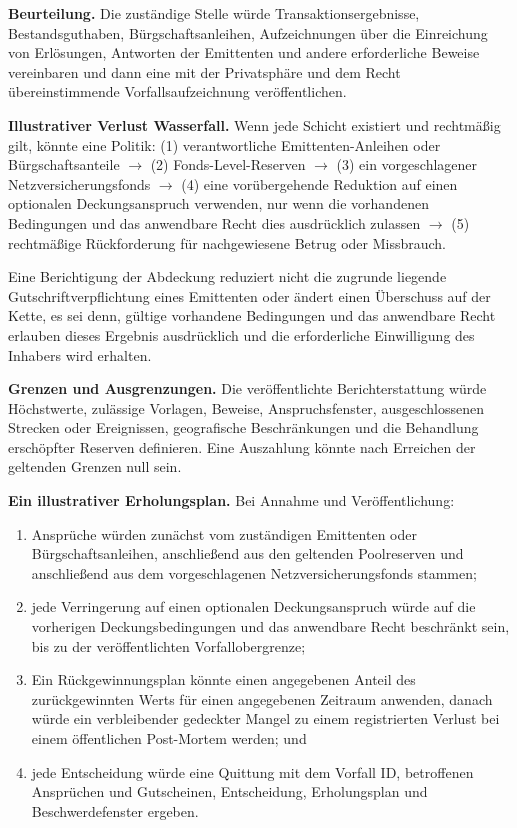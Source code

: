 \documentclass[11pt]{article}
\begin{document}
\textbf{Beurteilung.} Die zuständige Stelle würde Transaktionsergebnisse, Bestandsguthaben, Bürgschaftsanleihen, Aufzeichnungen über die Einreichung von Erlösungen, Antworten der Emittenten und andere erforderliche Beweise vereinbaren und dann eine mit der Privatsphäre und dem Recht übereinstimmende Vorfallsaufzeichnung veröffentlichen.

\textbf{Illustrativer Verlust Wasserfall.} Wenn jede Schicht existiert und rechtmäßig gilt, könnte eine Politik: (1) verantwortliche Emittenten-Anleihen oder Bürgschaftsanteile $\to$ (2) Fonds-Level-Reserven $\to$ (3) ein vorgeschlagener Netzversicherungsfonds $\to$ (4) eine vorübergehende Reduktion auf einen optionalen Deckungsanspruch verwenden, nur wenn die vorhandenen Bedingungen und das anwendbare Recht dies ausdrücklich zulassen $\to$ (5) rechtmäßige Rückforderung für nachgewiesene Betrug oder Missbrauch.

Eine Berichtigung der Abdeckung reduziert nicht die zugrunde liegende Gutschriftverpflichtung eines Emittenten oder ändert einen Überschuss auf der Kette, es sei denn, gültige vorhandene Bedingungen und das anwendbare Recht erlauben dieses Ergebnis ausdrücklich und die erforderliche Einwilligung des Inhabers wird erhalten.

\textbf{Grenzen und Ausgrenzungen.} Die veröffentlichte Berichterstattung würde Höchstwerte, zulässige Vorlagen, Beweise, Anspruchsfenster, ausgeschlossenen Strecken oder Ereignissen, geografische Beschränkungen und die Behandlung erschöpfter Reserven definieren. Eine Auszahlung könnte nach Erreichen der geltenden Grenzen null sein.

\textbf{Ein illustrativer Erholungsplan.} Bei Annahme und Veröffentlichung:

\begin{enumerate}[leftmargin=*]
\item Ansprüche würden zunächst vom zuständigen Emittenten oder Bürgschaftsanleihen, anschließend aus den geltenden Poolreserven und anschließend aus dem vorgeschlagenen Netzversicherungsfonds stammen;
\item jede Verringerung auf einen optionalen Deckungsanspruch würde auf die vorherigen Deckungsbedingungen und das anwendbare Recht beschränkt sein, bis zu der veröffentlichten Vorfallobergrenze;
\item Ein Rückgewinnungsplan könnte einen angegebenen Anteil des zurückgewinnten Werts für einen angegebenen Zeitraum anwenden, danach würde ein verbleibender gedeckter Mangel zu einem registrierten Verlust bei einem öffentlichen Post-Mortem werden; und
\item jede Entscheidung würde eine Quittung mit dem Vorfall ID, betroffenen Ansprüchen und Gutscheinen, Entscheidung, Erholungsplan und Beschwerdefenster ergeben.
\end{enumerate}
\end{document}
